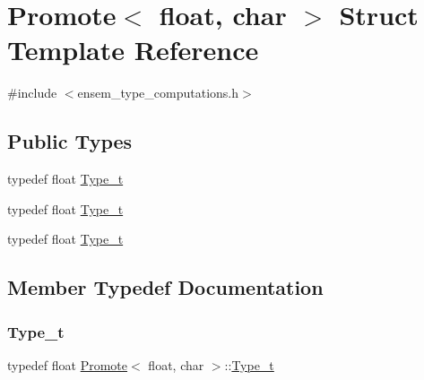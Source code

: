 \hypertarget{structPromote_3_01float_00_01char_01_4}{}\section{Promote$<$ float, char $>$ Struct Template Reference}
\label{structPromote_3_01float_00_01char_01_4}


{\ttfamily \#include $<$ensem\+\_\+type\+\_\+computations.\+h$>$}

\subsection*{Public Types}
\begin{DoxyCompactItemize}
\item 
typedef float \mbox{\hyperlink{structPromote_3_01float_00_01char_01_4_a9eacd1e5cdca40ea6e663825796599fc}{Type\+\_\+t}}
\item 
typedef float \mbox{\hyperlink{structPromote_3_01float_00_01char_01_4_a9eacd1e5cdca40ea6e663825796599fc}{Type\+\_\+t}}
\item 
typedef float \mbox{\hyperlink{structPromote_3_01float_00_01char_01_4_a9eacd1e5cdca40ea6e663825796599fc}{Type\+\_\+t}}
\end{DoxyCompactItemize}


\subsection{Member Typedef Documentation}
\mbox{\label{structPromote_3_01float_00_01char_01_4_a9eacd1e5cdca40ea6e663825796599fc}} 
\subsubsection{\texorpdfstring{Type\_t}{Type\_t}\hspace{0.1cm}{\footnotesize\ttfamily [1/3]}}
{\footnotesize\ttfamily typedef float \mbox{\hyperlink{structPromote}{Promote}}$<$ float, char $>$\+::\mbox{\hyperlink{structPromote_3_01float_00_01char_01_4_a9eacd1e5cdca40ea6e663825796599fc}{Type\+\_\+t}}}

\mbox{\label{structPromote_3_01float_00_01char_01_4_a9eacd1e5cdca40ea6e663825796599fc}} 
